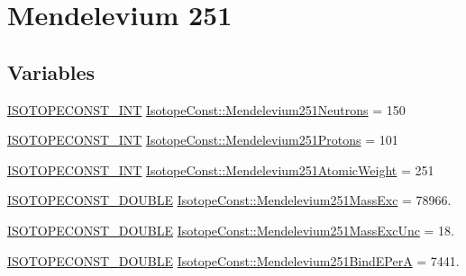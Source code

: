 \hypertarget{group___isotope_const-_mendelevium-_md251}{}\section{Mendelevium 251}
\label{group___isotope_const-_mendelevium-_md251}
\subsection*{Variables}
\begin{DoxyCompactItemize}
\item 
\mbox{\hyperlink{group___isotope_const-_macros_ga5f18360b3e99483a35c32d789e62621c}{I\+S\+O\+T\+O\+P\+E\+C\+O\+N\+S\+T\+\_\+\+I\+NT}} \mbox{\hyperlink{group___isotope_const-_mendelevium-_md251_gaded740f75ff377e3164b8083197b2f95}{Isotope\+Const\+::\+Mendelevium251\+Neutrons}} = 150
\item 
\mbox{\hyperlink{group___isotope_const-_macros_ga5f18360b3e99483a35c32d789e62621c}{I\+S\+O\+T\+O\+P\+E\+C\+O\+N\+S\+T\+\_\+\+I\+NT}} \mbox{\hyperlink{group___isotope_const-_mendelevium-_md251_ga42d6f624a84aedb747a0732703a7e6b4}{Isotope\+Const\+::\+Mendelevium251\+Protons}} = 101
\item 
\mbox{\hyperlink{group___isotope_const-_macros_ga5f18360b3e99483a35c32d789e62621c}{I\+S\+O\+T\+O\+P\+E\+C\+O\+N\+S\+T\+\_\+\+I\+NT}} \mbox{\hyperlink{group___isotope_const-_mendelevium-_md251_gab57430b550eeaebd6151af5244cf48f7}{Isotope\+Const\+::\+Mendelevium251\+Atomic\+Weight}} = 251
\item 
\mbox{\hyperlink{group___isotope_const-_macros_ga8f45a7272ce02c0b4c65c44636ed719a}{I\+S\+O\+T\+O\+P\+E\+C\+O\+N\+S\+T\+\_\+\+D\+O\+U\+B\+LE}} \mbox{\hyperlink{group___isotope_const-_mendelevium-_md251_ga2037d92f257f8a801e0714dcf3b5c105}{Isotope\+Const\+::\+Mendelevium251\+Mass\+Exc}} = 78966.
\item 
\mbox{\hyperlink{group___isotope_const-_macros_ga8f45a7272ce02c0b4c65c44636ed719a}{I\+S\+O\+T\+O\+P\+E\+C\+O\+N\+S\+T\+\_\+\+D\+O\+U\+B\+LE}} \mbox{\hyperlink{group___isotope_const-_mendelevium-_md251_ga57760e3234da1d4c12d034697742eac1}{Isotope\+Const\+::\+Mendelevium251\+Mass\+Exc\+Unc}} = 18.
\item 
\mbox{\hyperlink{group___isotope_const-_macros_ga8f45a7272ce02c0b4c65c44636ed719a}{I\+S\+O\+T\+O\+P\+E\+C\+O\+N\+S\+T\+\_\+\+D\+O\+U\+B\+LE}} \mbox{\hyperlink{group___isotope_const-_mendelevium-_md251_gadd42238d7b862fb74c19a1f76b41bca3}{Isotope\+Const\+::\+Mendelevium251\+Bind\+E\+PerA}} = 7441.

\end{DoxyCompactItemize}
